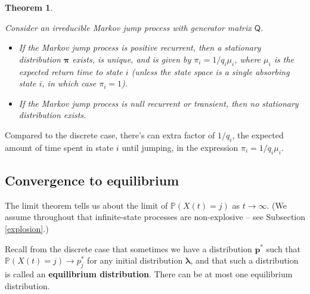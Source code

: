 \documentclass[
  a4paper,
]{article}
\providecommand{\tightlist}{%
  \setlength{\itemsep}{0pt}\setlength{\parskip}{0pt}}
\newtheorem{theorem}{Theorem}[section]
\theoremstyle{definition}
\theoremstyle{definition}
\theoremstyle{definition}
\theoremstyle{remark}
\begin{document}
\begin{theorem}
\protect\hypertarget{thm:statex-cont}{}\label{thm:statex-cont}

Consider an irreducible Markov jump process with generator matrix \(\mathsf Q\).

\begin{itemize}
\tightlist
\item
  If the Markov jump process is positive recurrent, then a stationary distribution \(\boldsymbol \pi\) exists, is unique, and is given by \(\pi_i = 1/q_i\mu_{i}\), where \(\mu_{i}\) is the expected return time to state \(i\) (unless the state space is a single absorbing state \(i\), in which case \(\pi_i = 1\)).
\item
  If the Markov jump process is null recurrent or transient, then no stationary distribution exists.
\end{itemize}

\end{theorem}

Compared to the discrete case, there's can extra factor of \(1/q_i\), the expected amount of time spent in state \(i\) until jumping, in the expression \(\pi_i = 1/q_i\mu_{i}\).

\hypertarget{convergernce-cont}{%
\subsection{Convergence to equilibrium}\label{convergernce-cont}}

The limit theorem tells us about the limit of \(\mathbb P(X(t) = j)\) as \(t \to \infty\). (We assume throughout that infinite-state processes are non-explosive -- see Subsection \ref{explosion}.)

Recall from the discrete case that sometimes we have a distribution \(\mathbf p^*\) such that \(\mathbb P(X(t) = j) \to p^*_j\) for any initial distribution \(\boldsymbol\lambda\), and that such a distribution is called an \textbf{equilibrium distribution}. There can be at most one equilibrium distribution.
\end{document}
